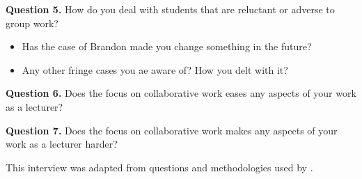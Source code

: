 \textbf{Question 5.} How do you deal with students that are reluctant or adverse to group work?

\begin{itemize}
    \item Has the case of Brandon made you change something in the future?
    \item Any other fringe cases you ae aware of? How you delt with it?
\end{itemize}

\textbf{Question 6.} Does the focus on collaborative work eases any aspects of your work as a lecturer?

\textbf{Question 7.} Does the focus on collaborative work makes any aspects of your work as a lecturer harder?

This interview was adapted from questions and methodologies used by \textcite{chiriac_2012,gillies_2010}.